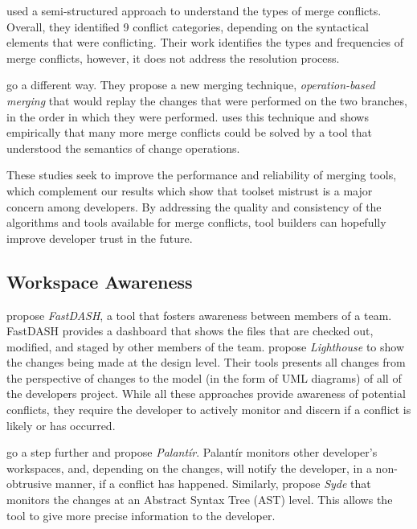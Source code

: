 \citet{accioly_understanding_2018} used a semi-structured approach to understand the types of merge conflicts.
Overall, they identified 9 conflict categories, depending on the syntactical elements that were conflicting.
Their work identifies the types and frequencies of merge conflicts, however, it does not address the resolution process.

\citet{lippe_operation-based_1992} go a different way.
They propose a new merging technique, \emph{operation-based merging} that would replay the changes that were performed on the two branches, in the order in which they were performed.
\citet{dig_effective_2008} uses this technique and shows empirically that many more merge conflicts could be solved by a tool that understood the semantics of change operations.

These studies seek to improve the performance and reliability of merging tools, which complement our results which show that toolset mistrust is a major concern among developers.
By addressing the quality and consistency of the algorithms and tools available for merge conflicts, tool builders can hopefully improve developer trust in the future.

\subsection{Workspace Awareness} 

\citet{biehl_fastdash:_2007} propose \emph{FastDASH}, a tool that fosters awareness between members of a team. 
FastDASH provides a dashboard that shows the files that are checked out, modified, and staged by other members of the team.
\citet{da_silva_lighthouse:_2006} propose \emph{Lighthouse} to show the changes being made at the design level.
Their tools presents all changes from the perspective of changes to the model (in the form of UML diagrams) of all of the developers project.
While all these approaches provide awareness of potential conflicts, they require the developer to actively monitor and discern if a conflict is likely or has occurred.

\citet{palantir, sarma_palantir:_2003} go a step further and propose \emph{Palant\'{i}r}.
Palant\'{i}r monitors other developer's workspaces, and, depending on the changes, will notify the developer, in a non-obtrusive manner, if a conflict has happened.
Similarly, \citet{hattori2010syde} propose \emph{Syde} that monitors the changes at an Abstract Syntax Tree (AST) level.
This allows the tool to give more precise information to the developer.

